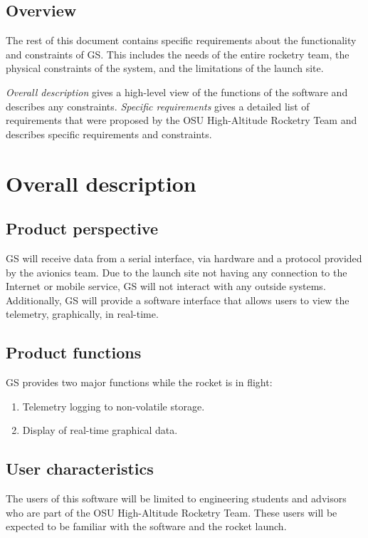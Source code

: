 \documentclass[10pt,draftclsnofoot,onecolumn]{IEEEtran}
\begin{document}
	\subsection{Overview}
	The rest of this document contains specific requirements about the functionality and constraints of GS. This includes
	the needs of the entire rocketry team, the physical constraints of the system, and the limitations of the launch site.
	
	\textit{Overall description} gives a high-level view of the functions of the software and describes any constraints.
	\textit{Specific requirements} gives a detailed list of requirements that were proposed by the OSU High-Altitude
	Rocketry Team and describes specific requirements and constraints.
		
	
	\section{Overall description}
	\subsection{Product perspective}
	GS will receive data from a serial interface, via hardware and a protocol provided by the avionics team.
	Due to the launch site not having any connection to the Internet or mobile service, GS will not interact with
	any outside systems. 
	Additionally, GS will provide a software interface that allows users to view the telemetry,
	graphically, in real-time.
	\subsection{Product functions}
	GS provides two major functions while the rocket is in flight:
	
	\begin{enumerate}
		\item Telemetry logging to non-volatile storage.
		\item Display of real-time graphical data. 
	\end{enumerate}
	
	\subsection{User characteristics}
	The users of this software will be limited to engineering students and advisors who are part of the OSU High-Altitude
	Rocketry Team.
	These users will be expected to be familiar with the software and the rocket launch.
	
\end{document}
